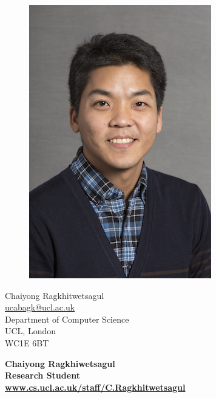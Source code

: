 \documentclass[a4paper,12pt,final]{memoir}
\begin{document}
%
\begin{figure}
	\hfill
	\includegraphics[width=0.8\columnwidth]{cr.jpg}
	\vspace{-6.5cm}
\end{figure}

\begin{flushright}\small
	Chaiyong Ragkhitwetsagul \\
	\url{ucabagk@ucl.ac.uk}  \\
    Department of Computer Science\\
    UCL, London\\
    WC1E 6BT

\end{flushright}\normalsize
\framebreak


\Huge\bfseries {\color{RoyalBlue} Chaiyong Ragkhiwetsagul} \\
\Large\bfseries  Research Student \\
\small \url{www.cs.ucl.ac.uk/staff/C.Ragkhitwetsagul} \\
\end{document}
